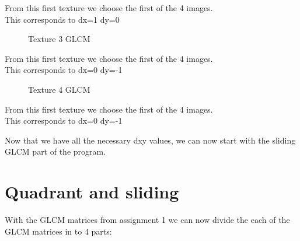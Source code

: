 \documentclass{article}
\begin{document}
	From this first texture we choose the first of the 4 images.\\
	This corresponds to dx=1 dy=0  

	\begin{figure}[h]%
		\centering
    	\caption{Texture 3 GLCM}%
    	\label{fig:o1_f3}%
	\end{figure}

	From this first texture we choose the first of the 4 images.\\
	This corresponds to dx=0 dy=-1  
\newpage
	\begin{figure}[h]%
		\centering
    	\caption{Texture 4 GLCM}%
    	\label{fig:o1_f1}%
	\end{figure}

	From this first texture we choose the first of the 4 images.\\
	This corresponds to dx=0 dy=-1

	
	
	Now that we have all the necessary dxy values, we can now start with the sliding GLCM part of the program. 


\newpage
\section{Quadrant and sliding}
	With the GLCM matrices from assignment 1 we can now divide the each of the GLCM matrices in to 4 parts: 
\end{document}
